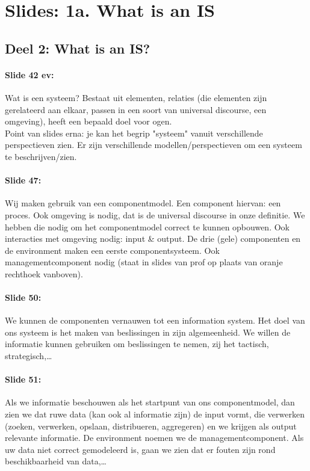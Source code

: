 \documentclass[10pt,a4paper]{report}
\begin{document}
\section{Slides: 1a. What is an IS}
\subsection{Deel 2: What is an IS?}
\paragraph{Slide 42 ev:}Wat is een systeem? Bestaat uit elementen, relaties (die elementen zijn gerelateerd aan elkaar, passen in een soort van universal discourse, een omgeving), heeft een bepaald doel voor ogen.\\
Point van slides erna: je kan het begrip "systeem" vanuit verschillende perspectieven zien. Er zijn verschillende modellen/perspectieven om een systeem te beschrijven/zien.

\paragraph{Slide 47:}Wij maken gebruik van een componentmodel. Een component hiervan: een proces. Ook omgeving is nodig, dat is de universal discourse in onze definitie. We hebben die nodig om het componentmodel correct te kunnen opbouwen. Ook interacties met omgeving nodig: input \& output. De drie (gele) componenten en de environment maken een eerste componentsysteem. Ook managementcomponent nodig (staat in slides van prof op plaats van oranje rechthoek vanboven).

\paragraph{Slide 50:}We kunnen de componenten vernauwen tot een information system. Het doel van ons systeem is het maken van beslissingen in zijn algemeenheid. We willen de informatie kunnen gebruiken om beslissingen te nemen, zij het tactisch, strategisch,… 
 
\paragraph{Slide 51:}Als we informatie beschouwen als het startpunt van ons componentmodel, dan zien we dat ruwe data (kan ook al informatie zijn) de input vormt, die verwerken (zoeken, verwerken, opslaan, distribueren, aggregeren) en we krijgen als output relevante informatie. De environment noemen we de managementcomponent. Als uw data niet correct gemodeleerd is, gaan we zien dat er fouten zijn rond beschikbaarheid van data,…
\end{document}
